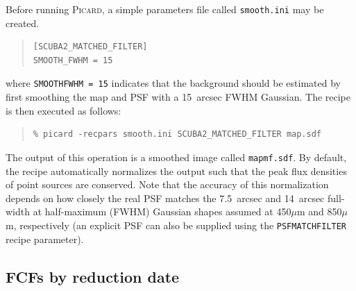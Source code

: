 \documentclass[twoside,11pt]{article}
\newcommand{\xlabel}[1]{}
\renewcommand{\_}{\texttt{\symbol{95}}}
\newenvironment{myquote}{
   \color{MidnightBlue}\begin{quote}\begin{small}}{
   \end{small}\end{quote}
}
\newcommand{\param}[1]{\texttt{#1}}
\newcommand{\file}[1]{\texttt{#1}}
\renewenvironment{myquote}{
      \begin{quote}\begin{small}}{
      \end{small}\end{quote}
   }
\begin{document}
Before running \textsc{Picard}, a simple parameters file called \file{smooth.ini}
may be created.
\begin{quote}
\begin{verbatim}
[SCUBA2_MATCHED_FILTER]
SMOOTH_FWHM = 15
\end{verbatim}
\end{quote}
%
where \param{SMOOTH\_FWHM~=~15} indicates that the background should
be estimated by first smoothing the map and PSF with a 15~arcsec FWHM
Gaussian. The recipe is then executed as follows:
%
\begin{myquote}
\begin{verbatim}
% picard -recpars smooth.ini SCUBA2_MATCHED_FILTER map.sdf
\end{verbatim}
\end{myquote}
%
The output of this operation is a smoothed image called
\file{map\_mf.sdf}. By default, the recipe automatically normalizes
the output such that the peak flux densities of point sources are
conserved. Note that the accuracy of this normalization depends on how
closely the real PSF matches the 7.5~arcsec and 14~arcsec full-width
at half-maximum (FWHM) Gaussian shapes assumed at 450$\mu$m and
850$\mu$m, respectively (an explicit PSF can also be supplied using
the \param{PSF\_MATCHFILTER} recipe parameter).



\newpage
\subsection{\xlabel{fcfsred}FCFs by reduction date}
\label{app:fcfs}
\end{document}
